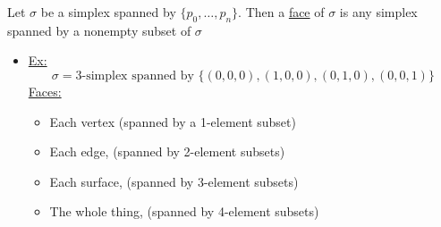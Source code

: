 \documentclass[../notes.tex]{subfiles}
\begin{document}
\begin{definition}
    Let $\sigma$ be a simplex spanned by $\{p_0,\dots,p_n\}$. Then a \underline{face}
    of $\sigma$ is any simplex spanned by a nonempty subset of $\sigma$
\end{definition}
\begin{itemize}
    \item \underline{Ex:}
        \[
            \sigma = \text{3-simplex spanned by $\{(0,0,0), (1,0,0), (0,1,0), (0,0,1)\}$}
        \]
        \underline{Faces:}\\
        \begin{itemize}
            \item Each vertex (spanned by a 1-element subset)
            \item Each edge, (spanned by 2-element subsets)
            \item Each surface, (spanned by 3-element subsets)
            \item The whole thing, (spanned by 4-element subsets)
        \end{itemize}
\end{itemize}
\end{document}
